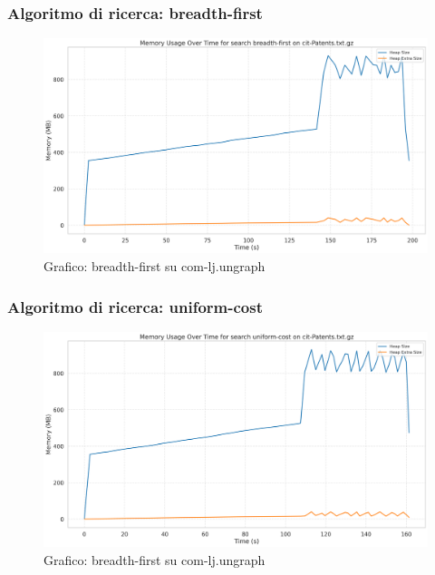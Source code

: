 \documentclass{article}
\begin{document}
\subsubsection{Algoritmo di ricerca: breadth-first}
\begin{figure}[h]\centering
\includegraphics[width=\textwidth]{../plots/cit-Patents_breadth-first.png}
\caption{Grafico: breadth-first su com-lj.ungraph}
\end{figure}
\subsubsection{Algoritmo di ricerca: uniform-cost}
\begin{figure}[h]\centering
\includegraphics[width=\textwidth]{../plots/cit-Patents_uniform-cost.png}
\caption{Grafico: breadth-first su com-lj.ungraph}
\end{figure}
\end{document}
